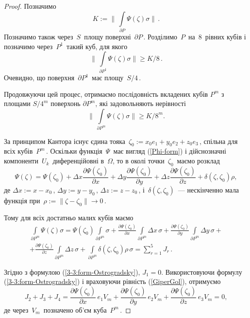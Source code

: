\documentclass[11pt, reqno]{amsart}
\begin{document}
\begin{proof} 
Позначимо
\[K:=\biggl\|\,\int\limits_{\partial P}\Psi(\zeta)\sigma\biggr\|\,.\]
Позначимо також через\, $S$\, площу поверхні\, $\partial P$\,.
Розділимо\, $P$\, на\, $8$\, рівних кубів і позначимо через\, $P^1$\,
такий куб, для якого
\[\biggl\|\,\int\limits_{\partial P^1}\Psi(\zeta)\sigma\biggr\|\geq K/8\,.\] 
Очевидно, що поверхня\, $\partial P^1$\, має площу\,
$S/4$\,.

Продовжуючи цей процес, отримаємо послідовність вкладених кубів
$P^m$ з площами $S/4^m$ поверхонь $\partial P^m$, які задовольняють
нерівності
\begin{equation}\label{3-3:ocinka-1}
\biggr\|\,\int\limits_{\partial P^m}\Psi(\zeta)\sigma\biggr\|\ge
K/8^m.
\end{equation}

За принципом Кантора існує єдина тояка\,
$\zeta_0:=x_0e_1+y_0e_2+z_0e_3$\,, спільна для всіх кубів\, $P^m$\,.
Оскільки функція\, $\Psi$\, має вигляд (\ref{Phi-form}) і дійснозначні компоненти\, $U_k$\, 
диференційовні в\, $\Omega$, то в околі точки\, $\zeta_0$\, маємо розклад
$$\Psi(\zeta)=\Psi(\zeta_0)+\Delta x\frac{\partial
\Psi(\zeta_0)}{\partial x}+\Delta y\frac{\partial
\Psi(\zeta_0)}{\partial y}+\Delta z\frac{\partial
\Psi(\zeta_0)}{\partial z}+\delta(\zeta,\zeta_0)\rho,$$ 
де
$\Delta x:=x-x_0$\,, $\Delta y:=y-y_0$\,, $\Delta z:=z-z_0$\,,
і\, $\delta(\zeta,\zeta_0)$\, --- нескінченно мала функція при\,
$\rho:=\|\zeta-\zeta_0\|\rightarrow0$\,.

Тому для всіх достатньо малих кубів маємо
\begin{multline*}
\int\limits_{\partial
P^m}\Psi(\zeta)\sigma=\Psi(\zeta_0)\int\limits_{\partial
P^m}\sigma+\frac{\partial \Psi(\zeta_0)}{\partial
x}\int\limits_{\partial P^m}\Delta x\,\sigma+\frac{\partial
\Psi(\zeta_0)}{\partial y}\int\limits_{\partial P^m}\Delta
y\,\sigma+\\
+\frac{\partial \Psi(\zeta_0)}{\partial z}\int\limits_{
\partial P^m}\Delta z\,\sigma+\int\limits_{
\partial P^m}\delta(\zeta,\zeta_0)\rho\,\sigma=\sum_{r=1}^5J_r\,.
\end{multline*}

Згідно з формулою (\ref{3-3:form-Ostrogradsky}), $J_1=0$. Використовуючи формулу
(\ref{3-3:form-Ostrogradsky}) і враховуючи рівність (\ref{GiperGol}), отримуємо
$$J_2+J_3+J_4=\frac{\partial \Psi(\zeta_0)}{\partial
x}\,e_1V_m+\frac{\partial \Psi(\zeta_0)}{\partial
y}\,e_2V_m+\frac{\partial \Psi(\zeta_0)}{\partial z}\,e_3V_m=0,$$
де через\, $V_m$\, позначено об'єм куба\, $P^m$\,.


\end{proof}
\end{document}
